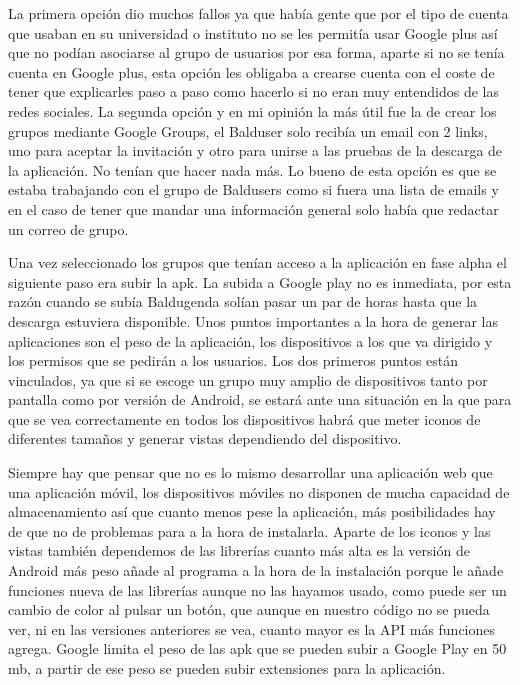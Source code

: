 La primera opción dio muchos fallos ya que había gente que por el tipo de cuenta que usaban en su universidad o instituto no se les permitía usar Google plus así que no podían asociarse al grupo de usuarios por esa forma, aparte si no se tenía cuenta en Google plus, esta opción les obligaba a crearse cuenta con el coste de tener que explicarles paso a paso como hacerlo si no eran muy entendidos de las redes sociales.
La segunda opción y en mi opinión la más útil fue la de crear los grupos mediante Google Groups, el Balduser solo recibía un email con 2 links, uno para aceptar la invitación y otro para unirse a las pruebas de la descarga de la aplicación. No tenían que hacer nada más. Lo bueno de esta opción es que se estaba trabajando con el grupo de Baldusers como si fuera una lista de emails y en el caso de tener que mandar una información general solo había que redactar un correo de grupo.

Una vez seleccionado los grupos que tenían acceso a la aplicación en fase alpha el siguiente paso era subir la apk.
La subida a Google play no es inmediata, por esta razón cuando se subía Baldugenda solían pasar un par de horas hasta que la descarga estuviera disponible.
Unos puntos importantes a la hora de generar las aplicaciones son el peso de la aplicación, los dispositivos a los que va dirigido y los permisos que se pedirán a los usuarios.
Los dos primeros puntos están vinculados, ya que si se escoge un grupo muy amplio de dispositivos tanto por pantalla como por versión de Android, se estará ante una situación en la que para que se vea correctamente en todos los dispositivos habrá que meter iconos de diferentes tamaños y generar vistas dependiendo del dispositivo.

Siempre hay que pensar que no es lo mismo desarrollar una aplicación web que una aplicación móvil, los dispositivos móviles no disponen de mucha capacidad de almacenamiento así que cuanto menos pese la aplicación, más posibilidades hay de que no de problemas para a la hora de instalarla.
Aparte de los iconos y las vistas también dependemos de las librerías cuanto más alta es la versión de Android más peso añade al programa a la hora de la instalación porque le añade funciones nueva de las librerías aunque no las hayamos usado, como puede ser un cambio de color al pulsar un botón, que aunque en nuestro código no se pueda ver, ni en las versiones anteriores se vea, cuanto mayor es la API más funciones agrega.
Google limita el peso de las apk que se pueden subir a Google Play en 50 mb, a partir de ese peso se pueden subir extensiones para la aplicación.

